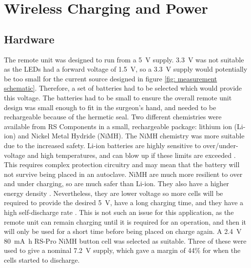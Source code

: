 \section{Wireless Charging and Power}\label{power}

\subsection{Hardware}

The remote unit was designed to run from a \SI{5}{\volt} supply. \SI{3.3}{\volt} was not suitable as the LEDs had a forward voltage of \SI{1.5}{\volt}, so a \SI{3.3}{\volt} supply would potentially be too small for the current source designed in figure \ref{fig: measurement schematic}. Therefore, a set of batteries had to be selected which would provide this voltage. The batteries had to be small to ensure the overall remote unit design was small enough to fit in the surgeon's hand, and needed to be rechargeable because of the hermetic seal. Two different chemistries were available from RS Components \cite{rs} in a small, rechargeable package: lithium ion (Li-ion) and Nickel Metal Hydride (NiMH). The NiMH chemistry was more suitable due to the increased safety. Li-ion batteries are highly sensitive to over/under-voltage and high temperatures, and can blow up if these limits are exceeded \cite{batteries}. This requires complex protection circuitry and may mean that the battery will not survive being placed in an autoclave. NiMH are much more resilient to over and under charging, so are much safer than Li-ion. They also have a higher energy density \cite{batteries}. Nevertheless, they are lower voltage so more cells will be required to provide the desired \SI{5}{\volt}, have a long charging time, and they have a high self-discharge rate \cite{batteries}. This is not such an issue for this application, as the remote unit can remain charging until it is required for an operation, and then it will only be used for a short time before being placed on charge again. A \SI{2.4}{\volt} \SI{80}{\milli\ampere\hour} RS-Pro NiMH button cell \cite{rs_pro_batteries} was selected as suitable. Three of these were used to give a nominal \SI{7.2}{\volt} supply, which gave a margin of 44\% for when the cells started to discharge.\\

